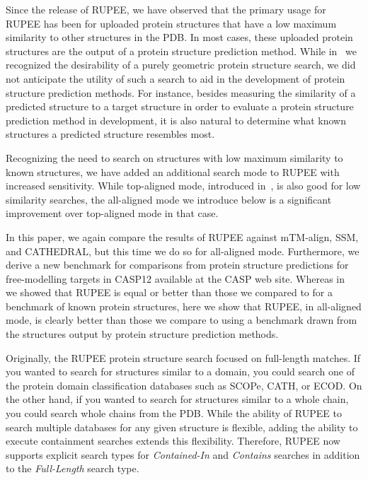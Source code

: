 \documentclass[10pt,letterpaper]{article}
\begin{document}
Since the release of RUPEE, we have observed that the primary usage for RUPEE has been for uploaded protein structures that have a low maximum similarity to other structures in the PDB.
In most cases, these uploaded protein structures are the output of a protein structure prediction method. 
While in~\cite{Ayoub2019} we recognized the desirability of a purely geometric protein structure search, we did not anticipate the utility of such a search to aid in the development of protein structure prediction methods.
For instance, besides measuring the similarity of a predicted structure to a target structure in order to evaluate a protein structure prediction method in development, it is also natural to determine what known structures a predicted structure resembles most. 

Recognizing the need to search on structures with low maximum similarity to known structures, we have added an additional search mode to RUPEE with increased sensitivity. 
While top-aligned mode, introduced in~\cite{Ayoub2019}, is also good for low similarity searches, the all-aligned mode we introduce below is a significant improvement over top-aligned mode in that case.  

In this paper, we again compare the results of RUPEE against mTM-align, SSM, and CATHEDRAL, but this time we do so for all-aligned mode.
Furthermore, we derive a new benchmark for comparisons from protein structure predictions for free-modelling targets in CASP12 available at the CASP web site. 
Whereas in~\cite{Ayoub2019} we showed that RUPEE is equal or better than those we compared to for a benchmark of known protein structures, here we show that RUPEE, in all-aligned mode, is clearly better than those we compare to using a benchmark drawn from the structures output by protein structure prediction methods. 

Originally, the RUPEE protein structure search focused on full-length matches. 
If you wanted to search for structures similar to a domain, you could search one of the protein domain classification databases such as SCOPe, CATH, or ECOD.
On the other hand, if you wanted to search for structures similar to a whole chain, you could search whole chains from the PDB. 
While the ability of RUPEE to search multiple databases for any given structure is flexible, adding the ability to execute containment searches extends this flexibility.
Therefore, RUPEE now supports explicit search types for \emph{Contained-In} and \emph{Contains} searches in addition to the \emph{Full-Length} search type.
\end{document}
